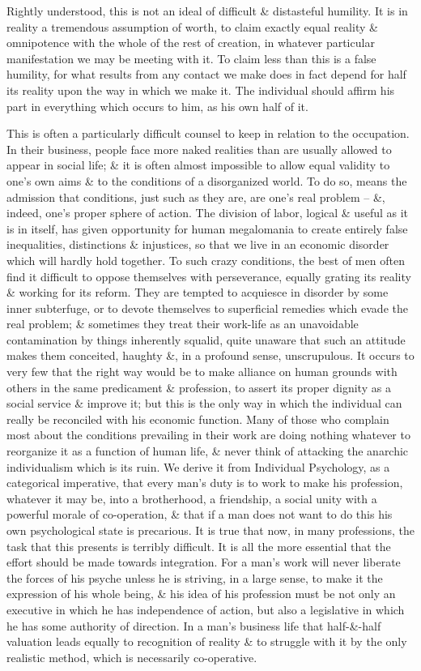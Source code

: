 \documentclass{article}
\numberwithin{equation}{section}
\begin{document}
Rightly understood, this is not an ideal of difficult \& distasteful humility. It is in reality a tremendous assumption of worth, to claim exactly equal reality \& omnipotence with the whole of the rest of creation, in whatever particular manifestation we may be meeting with it. To claim less than this is a false humility, for what results from any contact we make does in fact depend for half its reality upon the way in which we make it. The individual should affirm his part in everything which occurs to him, as his own half of it.

This is often a particularly difficult counsel to keep in relation to the occupation. In their business, people face more naked realities than are usually allowed to appear in social life; \& it is often almost impossible to allow equal validity to one's own aims \& to the conditions of a disorganized world. To do so, means the admission that conditions, just such as they are, are one's real problem -- \&, indeed, one's proper sphere of action. The division of labor, logical \& useful as it is in itself, has given opportunity for human megalomania to create entirely false inequalities, distinctions \& injustices, so that we live in an economic disorder which will hardly hold together. To such crazy conditions, the best of men often find it difficult to oppose themselves with perseverance, equally grating its reality \& working for its reform. They are tempted to acquiesce in disorder by some inner subterfuge, or to devote themselves to superficial remedies which evade the real problem; \& sometimes they treat their work-life as an unavoidable contamination by things inherently squalid, quite unaware that such an attitude makes them conceited, haughty \&, in a profound sense, unscrupulous. It occurs to very few that the right way would be to make alliance on human grounds with others in the same predicament \& profession, to assert its proper dignity as a social service \& improve it; but this is the only way in which the individual can really be reconciled with his economic function. Many of those who complain most about the conditions prevailing in their work are doing nothing whatever to reorganize it as a function of human life, \& never think of attacking the anarchic individualism which is its ruin. We derive it from Individual Psychology, as a categorical imperative, that every man's duty is to work to make his profession, whatever it may be, into a brotherhood, a friendship, a social unity with a powerful morale of co-operation, \& that if a man does not want to do this his own psychological state is precarious. It is true that now, in many professions, the task that this presents is terribly difficult. It is all the more essential that the effort should be made towards integration. For a man's work will never liberate the forces of his psyche unless he is striving, in a large sense, to make it the expression of his whole being, \& his idea of his profession must be not only an executive in which he has independence of action, but also a legislative in which he has some authority of direction. In a man's business life that half-\&-half valuation leads equally to recognition of reality \& to struggle with it by the only realistic method, which is necessarily co-operative.
\end{document}
